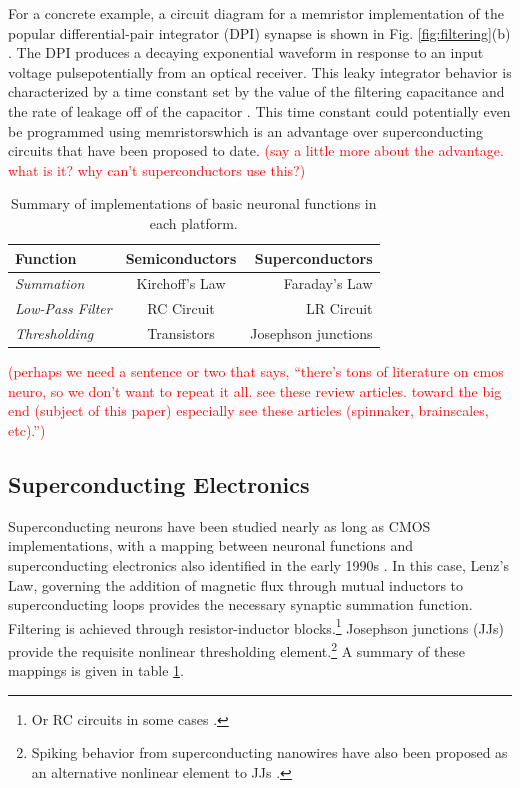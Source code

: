 \documentclass[twocolumn]{article}
\begin{document}
For a concrete example, a circuit diagram for a memristor implementation of the popular differential-pair integrator (DPI) synapse is shown in Fig. \ref{fig:filtering}(b) \cite{dalgaty2019hybrid}. The DPI produces a decaying exponential waveform in response to an input voltage pulse\textemdash potentially from an optical receiver. This leaky integrator behavior is characterized by a time constant set by the value of the filtering capacitance and the rate of leakage off of the capacitor \cite{chicca2014neuromorphic}. This time constant could potentially even be programmed using memristors\textemdash which is an advantage over superconducting circuits that have been proposed to date. \textcolor{red}{(say a little more about the advantage. what is it? why can't superconductors use this?)}

\begin{table}[h]
  \begin{center}
    \label{tab:mathtable}
    \begin{tabular}{l|c|r} %
      \textbf{Function} & \textbf{Semiconductors} & \textbf{Superconductors}\\
      \hline
      \textit{Summation} & Kirchoff's Law & Faraday's Law \\
      \textit{Low-Pass Filter} & RC Circuit & LR Circuit\\
      \textit{Thresholding} & Transistors & Josephson junctions\\
    \end{tabular}
    \caption{Summary of implementations of basic neuronal functions in each platform.}
  \end{center}
\end{table}

\textcolor{red}{(perhaps we need a sentence or two that says, ``there's tons of literature on cmos neuro, so we don't want to repeat it all. see these review articles. toward the big end (subject of this paper) especially see these articles (spinnaker, brainscales, etc).'')}

\subsection{Superconducting Electronics}
Superconducting neurons have been studied nearly as long as CMOS implementations, with a mapping between neuronal functions and superconducting electronics also identified in the early 1990s \cite{hago1991, hiak1991}. In this case, Lenz's Law, governing the addition of magnetic flux through mutual inductors to superconducting loops provides the necessary synaptic summation function. Filtering is achieved through resistor-inductor blocks.\footnote{Or RC circuits in some cases \cite{crotty2010josephson}.}  Josephson junctions (JJs) provide the requisite nonlinear thresholding element.\footnote{Spiking behavior from superconducting nanowires have also been proposed as an alternative nonlinear element to JJs \cite{toomey2019design}.} A summary of these mappings is given in table \ref{tab:mathtable}. 
\end{document}
